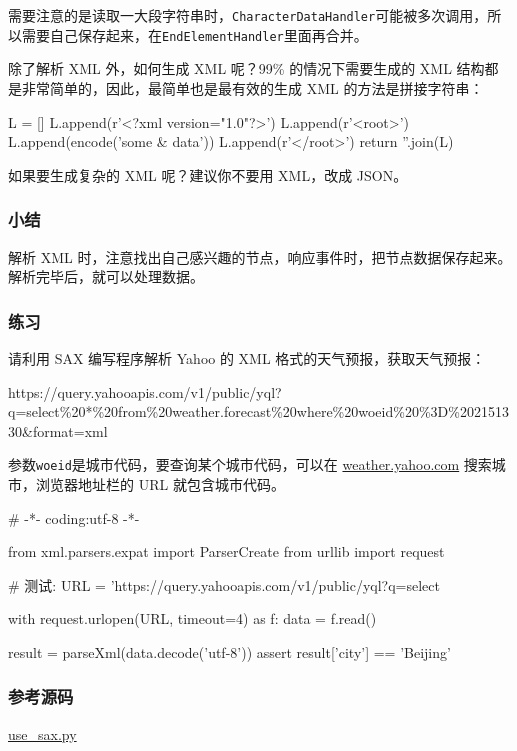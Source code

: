 需要注意的是读取一大段字符串时，\texttt{CharacterDataHandler}可能被多次调用，所以需要自己保存起来，在\texttt{EndElementHandler}里面再合并。

除了解析 XML 外，如何生成 XML 呢？99\% 的情况下需要生成的 XML
结构都是非常简单的，因此，最简单也是最有效的生成 XML
的方法是拼接字符串：

\begin{pythoncode}
L = []
L.append(r'<?xml version="1.0"?>')
L.append(r'<root>')
L.append(encode('some & data'))
L.append(r'</root>')
return ''.join(L)
\end{pythoncode}

如果要生成复杂的 XML 呢？建议你不要用 XML，改成 JSON。

\hypertarget{ux5c0fux7ed3}{%
\subsubsection{小结}\label{ux5c0fux7ed3}}

解析 XML
时，注意找出自己感兴趣的节点，响应事件时，把节点数据保存起来。解析完毕后，就可以处理数据。

\hypertarget{ux7ec3ux4e60}{%
\subsubsection{练习}\label{ux7ec3ux4e60}}

请利用 SAX 编写程序解析 Yahoo 的 XML 格式的天气预报，获取天气预报：

https://query.yahooapis.com/v1/public/yql?q=select\%20*\%20from\%20weather.forecast\%20where\%20woeid\%20\%3D\%202151330\&format=xml

参数\texttt{woeid}是城市代码，要查询某个城市代码，可以在
\href{https://weather.yahoo.com/}{weather.yahoo.com}
搜索城市，浏览器地址栏的 URL 就包含城市代码。

\begin{pythoncode}
# -*- coding:utf-8 -*-

from xml.parsers.expat import ParserCreate
from urllib import request
\end{pythoncode}

\begin{pythoncode}
# 测试:
URL = 'https://query.yahooapis.com/v1/public/yql?q=select%

with request.urlopen(URL, timeout=4) as f:
    data = f.read()

result = parseXml(data.decode('utf-8'))
assert result['city'] == 'Beijing'
\end{pythoncode}

\hypertarget{ux53c2ux8003ux6e90ux7801}{%
\subsubsection{参考源码}\label{ux53c2ux8003ux6e90ux7801}}

\href{https://github.com/michaelliao/learn-python3/blob/master/samples/commonlib/use_sax.py}{use\_sax.py}

